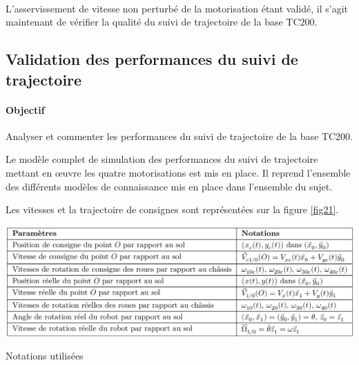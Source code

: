 \newpage



~\

L'asservissement de vitesse non perturbé de la motorisation étant validé, il s'agit maintenant de vérifier la qualité du suivi de trajectoire de la base TC200.

\subsection{Validation des performances du suivi de trajectoire}

\paragraph{Objectif} Analyser et commenter les performances du suivi de trajectoire de la base TC200.

Le modèle complet de simulation des performances du suivi de trajectoire mettant en \oe uvre les quatre motorisations est mis en place. Il reprend l'ensemble des différents modèles de connaissance mis en place dans l'ensemble du sujet.

Les vitesses et la trajectoire de consignes sont représentées sur la figure \ref{fig21}.


\begin{table}[!ht]
\begin{center}
 \includegraphics[width=0.75\linewidth]{img/tab06.png}
  \caption{Notations utilisées}
\label{tab06}
 \end{center}
\end{table}


